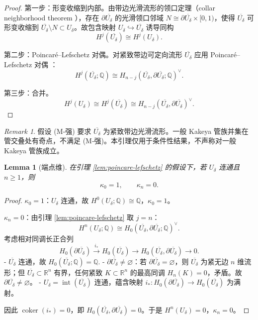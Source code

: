 \documentclass[11pt,a4paper]{article}
\newtheorem{lemma}[theorem]{Lemma}
\theoremstyle{remark}
\newtheorem{remark}[theorem]{Remark}
\begin{document}
	\begin{proof}
		第一步：形变收缩到内部。由带边光滑流形的领口定理（collar neighborhood theorem \cite{HatcherAT}），存在 $\partial\overline{U_\delta}$ 的光滑领口邻域 $N\cong\partial\overline{U_\delta}\times[0,1)$，使得 $\overline{U_\delta}$ 可形变收缩到 $\overline{U_\delta}\setminus N\subset U_\delta$。故包含映射 $U_\delta\hookrightarrow\overline{U_\delta}$ 诱导同构
		\[
		H^j(\overline{U_\delta})\cong H^j(U_\delta).
		\]
		
		第二步：Poincaré--Lefschetz 对偶。对紧致带边可定向流形 $\overline{U_\delta}$ 应用 Poincaré--Lefschetz 对偶 \cite{HatcherAT}：
		\[
		H^j(\overline{U_\delta};\mathbb Q)\cong H_{n-j}(\overline{U_\delta},\partial\overline{U_\delta};\mathbb Q)^\vee.
		\]
		
		第三步：合并。
		\[
		H^j(U_\delta)\cong H^j(\overline{U_\delta})\cong H_{n-j}(\overline{U_\delta},\partial\overline{U_\delta})^\vee.
		\]
	\end{proof}
	
	\begin{remark}
		假设 (M‑强) 要求 $\overline{U_\delta}$ 为紧致带边光滑流形。一般 Kakeya 管族并集在管交叠处有奇点，不满足 (M‑强)。本引理仅用于条件性结果，不声称对一般 Kakeya 管族成立。
	\end{remark}
	
	\begin{lemma}[端点维]
		\label{lem:endpoint-dim}
		在引理 \ref{lem:poincare-lefschetz} 的假设下，若 $U_\delta$ 连通且 $n\ge1$，则
		\[
		\kappa_0=1,\qquad \kappa_n=0.
		\]
	\end{lemma}
	
	\begin{proof}
		$\kappa_0=1$：$U_\delta$ 连通，故 $H^0(U_\delta;\mathbb Q)\cong\mathbb Q$，$\kappa_0=1$。
		
		$\kappa_n=0$：由引理 \ref{lem:poincare-lefschetz} 取 $j=n$：
		\[
		H^n(U_\delta;\mathbb Q)\cong H_0(\overline{U_\delta},\partial\overline{U_\delta};\mathbb Q)^\vee.
		\]
		考虑相对同调长正合列
		\[
		H_0(\partial\overline{U_\delta})\xrightarrow{i_*}H_0(\overline{U_\delta})\to H_0(\overline{U_\delta},\partial\overline{U_\delta})\to 0.
		\]
		- $\overline{U_\delta}$ 连通，故 $H_0(\overline{U_\delta};\mathbb Q)=\mathbb Q$.
		- $\partial\overline{U_\delta}\neq\varnothing$：若 $\partial\overline{U_\delta}=\varnothing$，则 $\overline{U_\delta}$ 为紧无边 $n$ 维流形；但 $\overline{U_\delta}\subset\mathbb R^n$ 有界，任何紧致 $K\subset\mathbb R^n$ 的最高同调 $H_n(K)=0$，矛盾。故 $\partial\overline{U_\delta}\neq\varnothing$。
		- $U_\delta=\operatorname{int}(\overline{U_\delta})$ 连通，蕴含映射 $i_*:H_0(\partial\overline{U_\delta})\to H_0(\overline{U_\delta})$ 为满射。
		
		因此 $\operatorname{coker}(i_*)=0$，即 $H_0(\overline{U_\delta},\partial\overline{U_\delta})=0$。于是 $H^n(U_\delta)=0$，$\kappa_n=0$。
	\end{proof}
	
\end{document}
